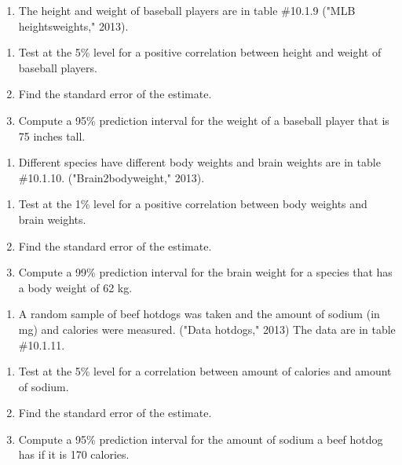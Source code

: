\documentclass[]{book}
\providecommand{\tightlist}{%
  \setlength{\itemsep}{0pt}\setlength{\parskip}{0pt}}
\begin{document}
\begin{enumerate}
\def\labelenumi{\arabic{enumi}.}
\setcounter{enumi}{4}
\tightlist
\item
  The height and weight of baseball players are in table \#10.1.9 ("MLB heightsweights," 2013).
\end{enumerate}

\begin{enumerate}
\def\labelenumi{\alph{enumi}.}
\item
  Test at the 5\% level for a positive correlation between height and weight of baseball players.
\item
  Find the standard error of the estimate.
\item
  Compute a 95\% prediction interval for the weight of a baseball player that is 75 inches tall.
\end{enumerate}

\begin{enumerate}
\def\labelenumi{\arabic{enumi}.}
\setcounter{enumi}{5}
\tightlist
\item
  Different species have different body weights and brain weights are in table \#10.1.10. ("Brain2bodyweight," 2013).
\end{enumerate}

\begin{enumerate}
\def\labelenumi{\alph{enumi}.}
\item
  Test at the 1\% level for a positive correlation between body weights and brain weights.
\item
  Find the standard error of the estimate.
\item
  Compute a 99\% prediction interval for the brain weight for a species that has a body weight of 62 kg.
\end{enumerate}

\begin{enumerate}
\def\labelenumi{\arabic{enumi}.}
\setcounter{enumi}{6}
\tightlist
\item
  A random sample of beef hotdogs was taken and the amount of sodium (in mg) and calories were measured. ("Data hotdogs," 2013) The data are in table \#10.1.11.
\end{enumerate}

\begin{enumerate}
\def\labelenumi{\alph{enumi}.}
\item
  Test at the 5\% level for a correlation between amount of calories and amount of sodium.
\item
  Find the standard error of the estimate.
\item
  Compute a 95\% prediction interval for the amount of sodium a beef hotdog has if it is 170 calories.
\end{enumerate}
\end{document}
